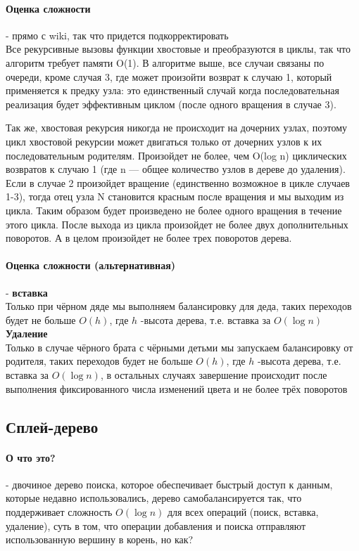 \documentclass[a4paper,10pt]{article}
\begin{document}
\paragraph{Оценка сложности} - прямо с wiki, так что придется подкорректировать \\
Все рекурсивные вызовы функции хвостовые и преобразуются в циклы, так что алгоритм требует памяти O(1). В алгоритме выше, все случаи связаны по очереди, кроме случая 3, где может произойти возврат к случаю 1, который применяется к предку узла: это единственный случай когда последовательная реализация будет эффективным циклом (после одного вращения в случае 3).

Так же, хвостовая рекурсия никогда не происходит на дочерних узлах, поэтому цикл хвостовой рекурсии может двигаться только от дочерних узлов к их последовательным родителям. Произойдет не более, чем O(log n) циклических возвратов к случаю 1 (где n — общее количество узлов в дереве до удаления). Если в случае 2 произойдет вращение (единственно возможное в цикле случаев 1-3), тогда отец узла N становится красным после вращения и мы выходим из цикла. Таким образом будет произведено не более одного вращения в течение этого цикла. После выхода из цикла произойдет не более двух дополнительных поворотов. А в целом произойдет не более трех поворотов дерева. \\
\paragraph{Оценка сложности (альтернативная)} - \textbf{вставка} \\
Только при чёрном дяде мы выполняем балансировку для деда, таких переходов будет не больше $O(h)$, где $h$ -высота дерева, т.е. вставка за $O(\log n)$ \\
\textbf{Удаление} \\
Только в случае чёрного брата с чёрными детьми мы запускаем балансировку от родителя, таких переходов будет не больше $O(h)$, где $h$ -высота дерева, т.е. вставка за $O(\log n)$, в остальных случаях завершение происходит после выполнения фиксированного числа изменений цвета и не более трёх поворотов \\

\subsection{Сплей-дерево}
\paragraph{О что это?} - двочиное дерево поиска, которое обеспечивает быстрый доступ к данным, которые недавно использовались, дерево самобалансируется так, что поддерживает сложность $O(\log n)$ для всех операций (поиск, вставка, удаление), суть в том, что операции добавления и поиска отправляют использованную вершину в корень, но как? \\
\end{document}
